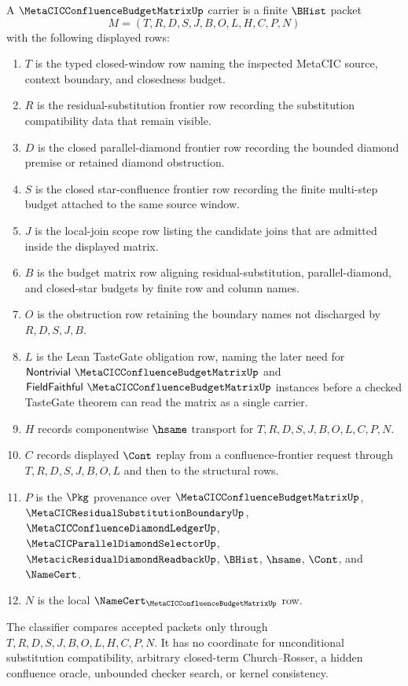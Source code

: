\begin{definition}
\label{def:metacic-confluence-budget-matrix-carrier}
A $\MetaCICConfluenceBudgetMatrixUp$ carrier is a finite $\BHist$ packet
$$
M=(T,R,D,S,J,B,O,L,H,C,P,N)
$$
with the following displayed rows:
\begin{enumerate}
\item $T$ is the typed closed-window row naming the inspected MetaCIC source, context boundary, and closedness budget.
\item $R$ is the residual-substitution frontier row recording the substitution compatibility data that remain visible.
\item $D$ is the closed parallel-diamond frontier row recording the bounded diamond premise or retained diamond obstruction.
\item $S$ is the closed star-confluence frontier row recording the finite multi-step budget attached to the same source window.
\item $J$ is the local-join scope row listing the candidate joins that are admitted inside the displayed matrix.
\item $B$ is the budget matrix row aligning residual-substitution, parallel-diamond, and closed-star budgets by finite row and column names.
\item $O$ is the obstruction row retaining the boundary names not discharged by $R,D,S,J,B$.
\item $L$ is the Lean TasteGate obligation row, naming the later need for $\mathsf{Nontrivial}\ \MetaCICConfluenceBudgetMatrixUp$ and $\mathsf{FieldFaithful}\ \MetaCICConfluenceBudgetMatrixUp$ instances before a checked TasteGate theorem can read the matrix as a single carrier.
\item $H$ records componentwise $\hsame$ transport for $T,R,D,S,J,B,O,L,C,P,N$.
\item $C$ records displayed $\Cont$ replay from a confluence-frontier request through $T,R,D,S,J,B,O,L$ and then to the structural rows.
\item $P$ is the $\Pkg$ provenance over $\MetaCICConfluenceBudgetMatrixUp$, $\MetaCICResidualSubstitutionBoundaryUp$, $\MetaCICConfluenceDiamondLedgerUp$, $\MetaCICParallelDiamondSelectorUp$, $\MetacicResidualDiamondReadbackUp$, $\BHist$, $\hsame$, $\Cont$, and $\NameCert$.
\item $N$ is the local $\NameCert_{\MetaCICConfluenceBudgetMatrixUp}$ row.
\end{enumerate}
The classifier compares accepted packets only through $T,R,D,S,J,B,O,L,H,C,P,N$. It has no coordinate for unconditional substitution compatibility, arbitrary closed-term Church--Rosser, a hidden confluence oracle, unbounded checker search, or kernel consistency.
\end{definition}

